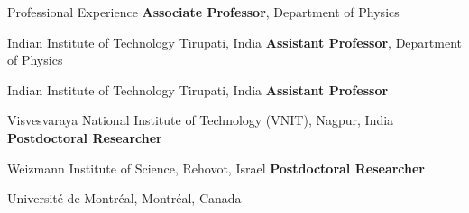 \begin{rubric}{Professional Experience}
\entry*[01/2024 -- present]%
  \textbf{Associate Professor}, Department of Physics\par
  Indian Institute of Technology Tirupati, India
\entry*[11/2018 -- 12/2023]%
  \textbf{Assistant Professor}, Department of Physics\par
  Indian Institute of Technology Tirupati, India
\entry*[03/2018 -- 11/2018]%
  \textbf{Assistant Professor}\par
  Visvesvaraya National Institute of Technology (VNIT), Nagpur, India
\entry*[03/2016 -- 03/2018]%
  \textbf{Postdoctoral Researcher}\par
  Weizmann Institute of Science, Rehovot, Israel
\entry*[11/2012 -- 03/2016]%
  \textbf{Postdoctoral Researcher}\par
  Universit\'e de Montr\'eal, Montr\'eal, Canada
\end{rubric}
